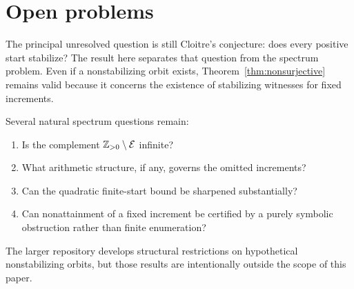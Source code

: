\section{Open problems}

The principal unresolved question is still Cloitre's conjecture: does every positive start stabilize? The result here separates that question from the spectrum problem. Even if a nonstabilizing orbit exists, Theorem~\ref{thm:nonsurjective} remains valid because it concerns the existence of stabilizing witnesses for fixed increments.

Several natural spectrum questions remain:
\begin{enumerate}
\item Is the complement $\mathbb{Z}_{>0}\setminus\mathcal{E}$ infinite?
\item What arithmetic structure, if any, governs the omitted increments?
\item Can the quadratic finite-start bound be sharpened substantially?
\item Can nonattainment of a fixed increment be certified by a purely symbolic obstruction rather than finite enumeration?
\end{enumerate}

The larger repository develops structural restrictions on hypothetical nonstabilizing orbits, but those results are intentionally outside the scope of this paper.
